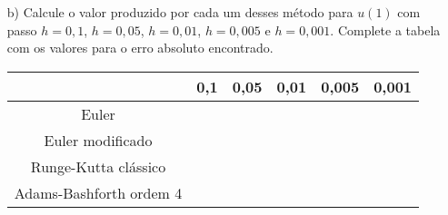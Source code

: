 \begin{exer}
\begin{itemize}
\item[b)] Calcule o valor produzido por cada um desses método para $u(1)$ com passo $h=0,1$, $h=0,05$, $h=0,01$, $h=0,005$ e $h=0,001$. Complete a tabela com os valores para o erro absoluto encontrado.
\begin{center}
\begin{tabular}{|c|c|c|c|c|c|}
\hline
&0,1&0,05&0,01&0,005&0,001\\
\hline
Euler&&&&&\\
\hline
Euler modificado&&&&&   \\
\hline
Runge-Kutta clássico&&&&&\\
\hline
Adams-Bashforth ordem 4&&&&&\\
\hline
\end{tabular}
\end{center}

\end{itemize}

\end{exer}


